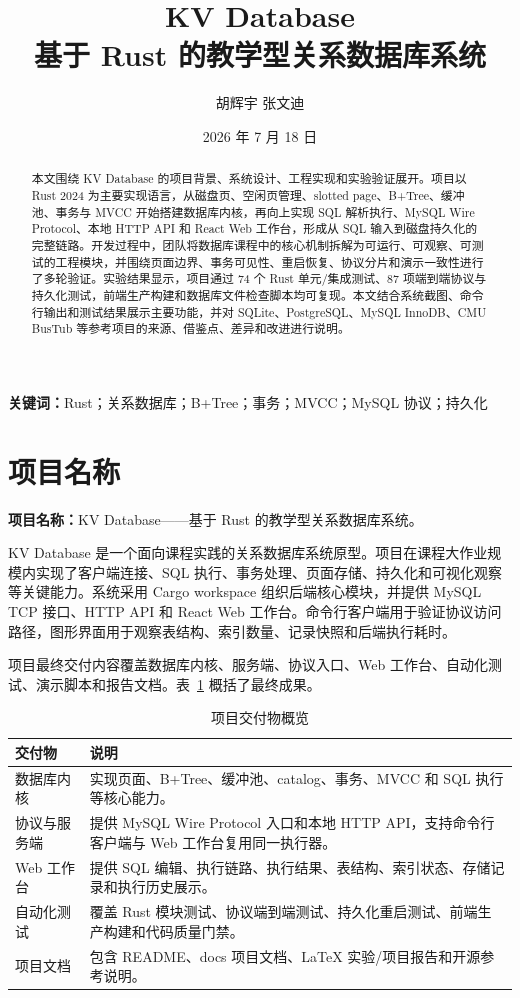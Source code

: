 \documentclass[UTF8,a4paper,12pt]{ctexart}
\title{\textbf{KV Database}\\[0.5em]\large 基于 Rust 的教学型关系数据库系统}
\author{胡辉宇 \quad 张文迪}
\date{2026 年 7 月 18 日}
\begin{document}
\maketitle
\thispagestyle{empty}

\begin{abstract}
本文围绕 KV Database 的项目背景、系统设计、工程实现和实验验证展开。项目以 Rust 2024 为主要实现语言，从磁盘页、空闲页管理、slotted page、B+Tree、缓冲池、事务与 MVCC 开始搭建数据库内核，再向上实现 SQL 解析执行、MySQL Wire Protocol、本地 HTTP API 和 React Web 工作台，形成从 SQL 输入到磁盘持久化的完整链路。开发过程中，团队将数据库课程中的核心机制拆解为可运行、可观察、可测试的工程模块，并围绕页面边界、事务可见性、重启恢复、协议分片和演示一致性进行了多轮验证。实验结果显示，项目通过 74 个 Rust 单元/集成测试、87 项端到端协议与持久化测试，前端生产构建和数据库文件检查脚本均可复现。本文结合系统截图、命令行输出和测试结果展示主要功能，并对 SQLite、PostgreSQL、MySQL InnoDB、CMU BusTub 等参考项目的来源、借鉴点、差异和改进进行说明。
\end{abstract}

\noindent\textbf{关键词：}Rust；关系数据库；B+Tree；事务；MVCC；MySQL 协议；持久化

\tableofcontents
\newpage

\section{项目名称}

\textbf{项目名称：}KV Database——基于 Rust 的教学型关系数据库系统。

KV Database 是一个面向课程实践的关系数据库系统原型。项目在课程大作业规模内实现了客户端连接、SQL 执行、事务处理、页面存储、持久化和可视化观察等关键能力。系统采用 Cargo workspace 组织后端核心模块，并提供 MySQL TCP 接口、HTTP API 和 React Web 工作台。命令行客户端用于验证协议访问路径，图形界面用于观察表结构、索引数量、记录快照和后端执行耗时。

项目最终交付内容覆盖数据库内核、服务端、协议入口、Web 工作台、自动化测试、演示脚本和报告文档。表~\ref{tab:deliverables} 概括了最终成果。

\begin{table}[H]
\centering
\caption{项目交付物概览}
\label{tab:deliverables}
\begin{tabularx}{\textwidth}{p{3.2cm}X}
\toprule
交付物 & 说明\\
\midrule
数据库内核 & 实现页面、B+Tree、缓冲池、catalog、事务、MVCC 和 SQL 执行等核心能力。\\
协议与服务端 & 提供 MySQL Wire Protocol 入口和本地 HTTP API，支持命令行客户端与 Web 工作台复用同一执行器。\\
Web 工作台 & 提供 SQL 编辑、执行链路、执行结果、表结构、索引状态、存储记录和执行历史展示。\\
自动化测试 & 覆盖 Rust 模块测试、协议端到端测试、持久化重启测试、前端生产构建和代码质量门禁。\\
项目文档 & 包含 README、docs 项目文档、LaTeX 实验/项目报告和开源参考说明。\\
\bottomrule
\end{tabularx}
\end{table}
\end{document}
